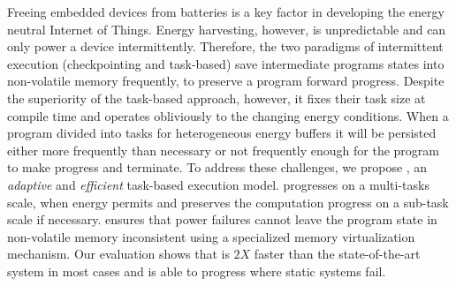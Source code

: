 %
Freeing embedded devices from batteries is a key factor in developing the energy neutral Internet of Things. 
Energy harvesting, however, is unpredictable and can only power a device intermittently. Therefore, the two paradigms of intermittent execution (checkpointing and task-based) save intermediate programs states into non-volatile memory frequently, to preserve a program forward progress. Despite the superiority of the task-based approach, however, it fixes their task size at compile time and operates obliviously to the changing energy conditions. When a program divided into tasks for heterogeneous energy buffers it will be persisted either more frequently than necessary or not frequently enough for the program to make progress and terminate. To address these challenges, we propose \sys, an \emph{adaptive} and \emph{efficient} task-based execution model. \sys progresses on a multi-tasks scale, when energy permits and preserves the computation progress on a sub-task scale if necessary. \sys ensures that power failures cannot leave the program state in non-volatile memory inconsistent using a specialized memory virtualization mechanism. Our evaluation shows that \sys is $2X$ faster than the state-of-the-art system in most cases and is able to progress where static systems fail. 